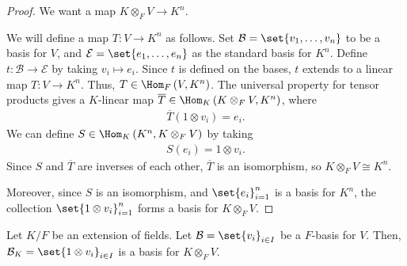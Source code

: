 \documentclass[10pt]{mypackage}
\begin{document}
  \begin{proof}
    We want a map $K\otimes_{F}V \rightarrow K^{n}$.\newline

    We will define a map $T: V\rightarrow K^{n}$ as follows. Set $\mathcal{B} = \set{v_1,\dots,v_n}$ to be a basis for $V$, and $\mathcal{E} = \set{e_1,\dots,e_n}$ as the standard basis for $K^n$. Define $t: \mathcal{B}\rightarrow \mathcal{E}$ by taking $v_i\mapsto e_i$. Since $t$ is defined on the bases, $t$ extends to a linear map $T: V\rightarrow K^n$. Thus, $T\in \Hom_{F}\left(V,K^{n}\right)$. The universal property for tensor products gives a $K$-linear map $\overline{T}\in \Hom_{K}\left(K\otimes_{F}V,K^{n}\right)$, where
    \begin{align*}
      \overline{T}\left(1\otimes v_i\right) = e_i.
    \end{align*}
    We can define $S\in \Hom_{K}\left(K^{n},K\otimes_{F}V\right)$ by taking
    \begin{align*}
      S\left(e_i\right) = 1\otimes v_i.
    \end{align*}
    Since $S$ and $\overline{T}$ are inverses of each other, $\overline{T}$ is an isomorphism, so $K\otimes_{F}V\cong K^n$.\newline

    Moreover, since $S$ is an isomorphism, and $\set{e_i}_{i=1}^{n}$ is a basis for $K^n$, the collection $\set{1\otimes v_i}_{i=1}^{n}$ forms a basis for $K\otimes_{F}V$.
  \end{proof}
  \begin{proposition}
    Let $K/F$ be an extension of fields. Let $\mathcal{B} = \set{v_i}_{i\in I}$ be a $F$-basis for $V$. Then, $\mathcal{B}_{K} = \set{1\otimes v_{i}}_{i\in I}$ is a basis for $K\otimes_{F}V$.
  \end{proposition}
\end{document}
